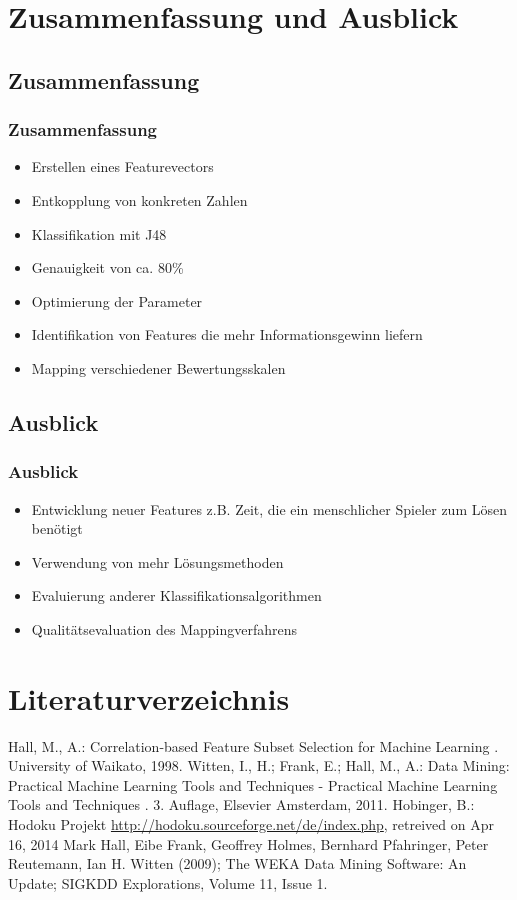 \documentclass[accentcolor=tud6b,colorbacktitle,inverttitle,landscape,german,presentation,t]{tudbeamer}
\begin{document}
\section{Zusammenfassung und Ausblick}
	\subsection{Zusammenfassung}
		\begin{frame}
		\frametitle{Zusammenfassung}
		\begin{itemize}
		\item Erstellen eines Featurevectors
		\item Entkopplung von konkreten Zahlen
		\item Klassifikation mit J48
		\item Genauigkeit von ca. 80\%
		\item Optimierung der Parameter
		\item Identifikation von Features die mehr Informationsgewinn liefern
		\item Mapping verschiedener Bewertungsskalen
		\end{itemize}
		\end{frame}

	\subsection{Ausblick}
		\begin{frame}
		\frametitle{Ausblick}
		\begin{itemize}
		\item Entwicklung neuer Features z.B. Zeit, die ein menschlicher Spieler zum Lösen benötigt
		\item Verwendung von mehr Lösungsmethoden
		\item Evaluierung anderer Klassifikationsalgorithmen
		\item Qualitätsevaluation des Mappingverfahrens
		\end{itemize}
		\end{frame}

\section{Literaturverzeichnis} 
	\begin{thebibliography}{10} 
	Hall, M., A.: {\glqq Correlation-based Feature Subset Selection for Machine Learning \grqq}. University of Waikato, 1998. 
	Witten, I., H.; Frank, E.; Hall, M., A.: {\glqq Data Mining: Practical Machine Learning Tools and Techniques - Practical Machine Learning Tools and Techniques \grqq}. 3. Auflage, Elsevier Amsterdam, 2011. 
	Hobinger, B.: Hodoku Projekt \url{http://hodoku.sourceforge.net/de/index.php}, retreived on Apr 16, 2014
	Mark Hall, Eibe Frank, Geoffrey Holmes, Bernhard Pfahringer, Peter Reutemann, Ian H. Witten (2009); The WEKA Data Mining Software: An Update; SIGKDD Explorations, Volume 11, Issue 1.
	\end{thebibliography}
\end{document}
